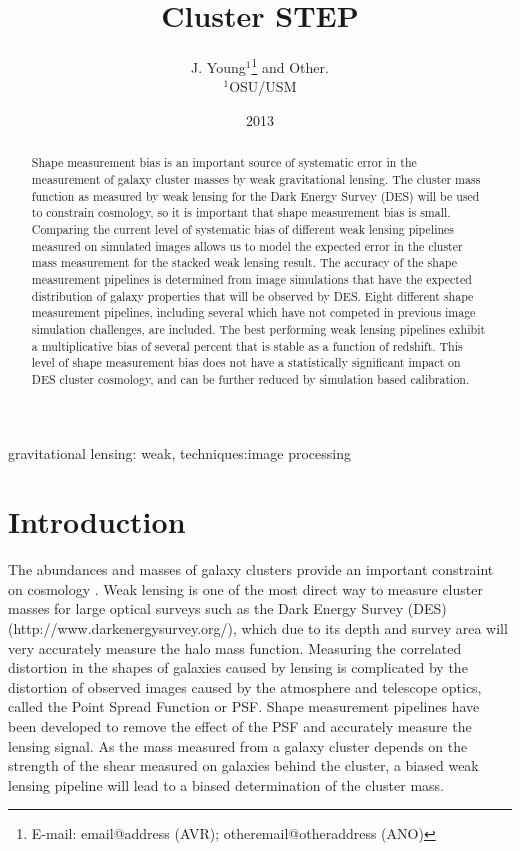 \documentclass[useAMS,usenatbib]{mn2e}
\title[Cluster Shear TEsting Program]{Cluster STEP}
\author[J. Young and Other]{J. Young$^{1}$\thanks{E-mail:
email@address (AVR); otheremail@otheraddress (ANO)} and 
Other.\\
$^{1}$OSU/USM \\
}
\begin{document}


\date{2013}

\pagerange{\pageref{firstpage}--\pageref{lastpage}} 

\maketitle

\label{firstpage}

\begin{abstract}
Shape measurement bias is an important source of systematic error in the 
measurement of galaxy cluster masses by weak gravitational lensing. The
cluster mass function as measured by weak lensing for the Dark Energy Survey (DES)
will be used to constrain cosmology, so it is important that shape measurement
bias is small. Comparing the current level of systematic bias of different 
weak lensing pipelines measured on simulated images allows us to model the expected error
in the cluster mass measurement for the stacked weak lensing
result. The accuracy of the shape measurement pipelines is determined from image simulations
that have the expected distribution of galaxy properties that will be observed by DES. Eight 
different shape measurement pipelines, including several which have not competed in previous
image simulation challenges, are included. The best performing weak
lensing pipelines exhibit a multiplicative bias of several percent 
that is stable as a function of redshift. This level of shape measurement bias does not have a statistically
significant impact on DES cluster cosmology, and can be further reduced by simulation based calibration.
\end{abstract}

\begin{keywords}
gravitational lensing: weak, techniques:image processing
\end{keywords}

\section{Introduction}
The abundances and masses of galaxy clusters provide an important constraint on 
cosmology \citep{obscos}. Weak lensing is one of the most direct way to measure cluster
masses for large optical surveys such as the Dark Energy Survey (DES)
(http://www.darkenergysurvey.org/), which due to its depth and
survey area will very accurately measure the halo mass function.
Measuring the correlated distortion in the shapes of galaxies caused by lensing is complicated
by the distortion of observed images caused by the atmosphere and telescope optics, called the 
Point Spread Function or PSF. Shape measurement pipelines have been developed to remove the 
effect of the PSF and accurately measure the lensing signal. As the
mass measured from a galaxy cluster depends on the strength of the
shear measured on galaxies behind the cluster, a biased weak lensing
pipeline will lead to a biased determination of the cluster mass.
 
\end{document}
